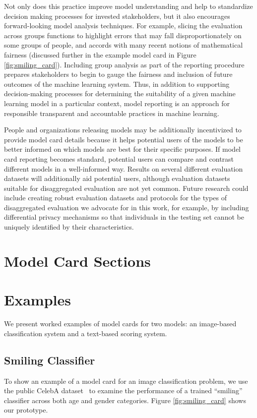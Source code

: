 \documentclass[format=sigconf]{acmart}
\begin{document}
Not only does this practice improve model understanding and help to standardize decision making processes for invested stakeholders, but it also encourages forward-looking model analysis techniques. For example, slicing the evaluation across groups functions to highlight errors that may fall disproportionately on some groups of people, and accords with many recent notions of mathematical fairness (discussed further in the example model card in Figure \ref{fig:smiling_card}).  Including group analysis as part of the reporting procedure prepares stakeholders to begin to gauge the fairness and inclusion of future outcomes of the machine learning system. Thus, in addition to supporting decision-making processes for determining the suitability of a given machine learning model in a particular context,  model reporting is an approach for responsible transparent and accountable practices in machine learning.

People and organizations releasing models may be additionally incentivized to provide model card details because it helps potential users of the models to be better informed on which models are best for their specific purposes.  If model card reporting becomes standard, potential users can compare and contrast different models in a well-informed way.  Results on several different evaluation datasets will additionally aid potential users, although evaluation datasets suitable for disaggregated evaluation are not yet common.  Future research could include creating robust evaluation datasets and protocols for the types of disaggregated evaluation we advocate for in this work, for example, by including differential privacy mechanisms \cite{DworkDifferential} so that individuals in the testing set cannot be uniquely identified by their characteristics.

\section{Model Card Sections}



\section{Examples}\label{sec:examples}
We present worked examples of model cards for two models: an image-based classification system and a text-based scoring system. 

\subsection{Smiling Classifier}
To show an example of a model card for an image classification problem, we use the public CelebA dataset~\cite{LiuEtAl2015} to examine the performance of a trained ``smiling'' classifier across both age and gender categories. Figure \ref{fig:smiling_card} shows our prototype.
\end{document}

